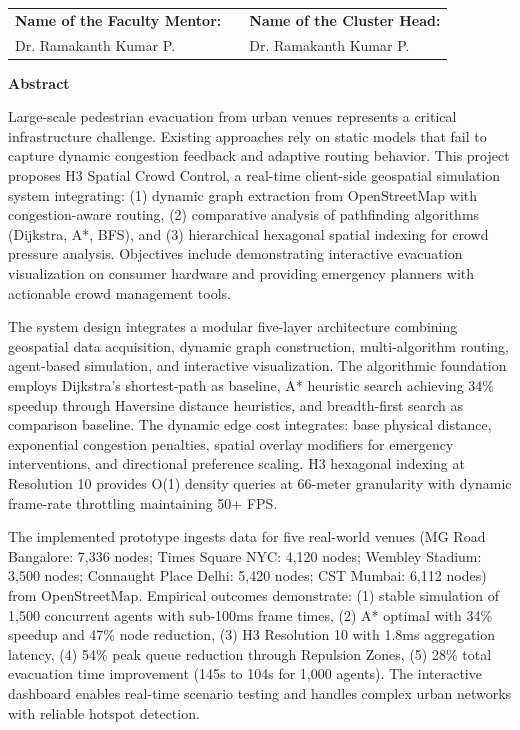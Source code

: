 \documentclass[12pt,a4paper,oneside]{report}
\begin{document}
\begin{titlepage}
\begin{center}
        \vspace{1.2cm}
        \small
        \begin{tabular}{p{5.5cm}cp{5.5cm}}
            \textbf{Name of the Faculty Mentor:} & \hfill & \textbf{Name of the Cluster Head:} \\
            Dr. Ramakanth Kumar P. & \hfill & Dr. Ramakanth Kumar P. \\
        \end{tabular}
    \end{center}
\end{titlepage}
\newpage
{}
\setcounter{page}{1}

\newpage
\thispagestyle{titlepage}
\begin{center}
    \Large\textbf{Abstract}
\end{center}
\vspace{1cm}

\noindent Large-scale pedestrian evacuation from urban venues represents a critical infrastructure challenge. Existing approaches rely on static models that fail to capture dynamic congestion feedback and adaptive routing behavior. This project proposes H3 Spatial Crowd Control, a real-time client-side geospatial simulation system integrating: (1) dynamic graph extraction from OpenStreetMap with congestion-aware routing, (2) comparative analysis of pathfinding algorithms (Dijkstra, A*, BFS), and (3) hierarchical hexagonal spatial indexing for crowd pressure analysis. Objectives include demonstrating interactive evacuation visualization on consumer hardware and providing emergency planners with actionable crowd management tools.

The system design integrates a modular five-layer architecture combining geospatial data acquisition, dynamic graph construction, multi-algorithm routing, agent-based simulation, and interactive visualization. The algorithmic foundation employs Dijkstra's shortest-path as baseline, A* heuristic search achieving 34\% speedup through Haversine distance heuristics, and breadth-first search as comparison baseline. The dynamic edge cost integrates: base physical distance, exponential congestion penalties, spatial overlay modifiers for emergency interventions, and directional preference scaling. H3 hexagonal indexing at Resolution 10 provides O(1) density queries at 66-meter granularity with dynamic frame-rate throttling maintaining 50+ FPS.

The implemented prototype ingests data for five real-world venues (MG Road Bangalore: 7,336 nodes; Times Square NYC: 4,120 nodes; Wembley Stadium: 3,500 nodes; Connaught Place Delhi: 5,420 nodes; CST Mumbai: 6,112 nodes) from OpenStreetMap. Empirical outcomes demonstrate: (1) stable simulation of 1,500 concurrent agents with sub-100ms frame times, (2) A* optimal with 34\% speedup and 47\% node reduction, (3) H3 Resolution 10 with 1.8ms aggregation latency, (4) 54\% peak queue reduction through Repulsion Zones, (5) 28\% total evacuation time improvement (145s to 104s for 1,000 agents). The interactive dashboard enables real-time scenario testing and handles complex urban networks with reliable hotspot detection.
\end{document}

